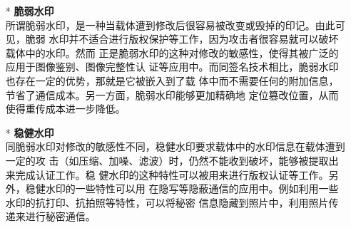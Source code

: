 \begin{itemize}
  \begin{itemize}
    \item[*] \textbf{脆弱水印}\\
    所谓脆弱水印，是一种当载体遭到修改后很容易被改变或毁掉的印记。由此可见，脆弱
    水印并不适合进行版权保护等工作，因为攻击者很容易就可以破坏载体中的水印。然而
    正是脆弱水印的这种对修改的敏感性，使得其被广泛的应用于图像鉴别、图像完整性认
    证等应用中。而同签名技术相比，脆弱水印也存在一定的优势，那就是它被嵌入到了载
    体中而不需要任何的附加信息，节省了通信成本。另一方面，脆弱水印能够更加精确地
    定位篡改位置，从而使得重传成本进一步降低。
    \par
    \vspace{-2.5mm}
    \item[*] \textbf{稳健水印}\\
    同脆弱水印对修改的敏感性不同，稳健水印要求载体中的水印信息在载体遭到一定的攻
    击（如压缩、加噪、滤波）时，仍然不能收到破坏，能够被提取出来完成认证工作。稳
    健水印的这种特性可以被用来进行版权认证等工作。另外，稳健水印的一些特性可以用
    在隐写等隐蔽通信的应用中。例如利用一些水印的抗打印、抗拍照等特性，可以将秘密
    信息隐藏到照片中，利用照片传递来进行秘密通信。\\
  \end{itemize}
\end{itemize}



